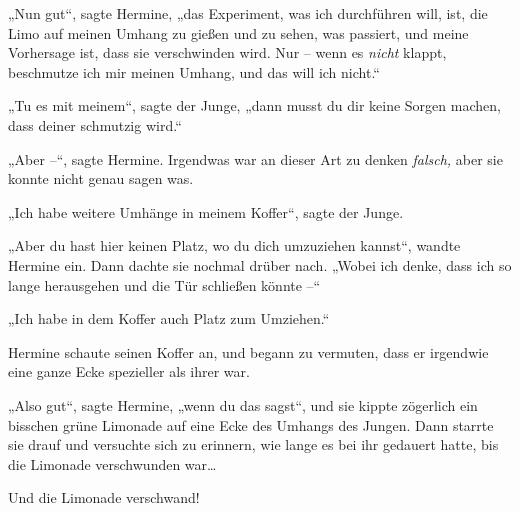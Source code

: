 „Nun gut“, sagte Hermine, „das Experiment, was ich durchführen will, ist, die Limo auf meinen Umhang zu gießen und zu sehen, was passiert, und meine Vorhersage ist, dass sie verschwinden wird. Nur – wenn es \emph{nicht} klappt, beschmutze ich mir meinen Umhang, und das will ich nicht.“

„Tu es mit meinem“, sagte der Junge, „dann musst du dir keine Sorgen machen, dass deiner schmutzig wird.“

„Aber –“, sagte Hermine. Irgendwas war an dieser Art zu denken \emph{falsch,} aber sie konnte nicht genau sagen was.

„Ich habe weitere Umhänge in meinem Koffer“, sagte der Junge.

„Aber du hast hier keinen Platz, wo du dich umzuziehen kannst“, wandte Hermine ein. Dann dachte sie nochmal drüber nach. „Wobei ich denke, dass ich so lange herausgehen und die Tür schließen könnte –“

„Ich habe in dem Koffer auch Platz zum Umziehen.“

Hermine schaute seinen Koffer an, und begann zu vermuten, dass er irgendwie eine ganze Ecke spezieller als ihrer war.

„Also gut“, sagte Hermine, „wenn du das sagst“, und sie kippte zögerlich ein bisschen grüne Limonade auf eine Ecke des Umhangs des Jungen. Dann starrte sie drauf und versuchte sich zu erinnern, wie lange es bei ihr gedauert hatte, bis die Limonade verschwunden war…

Und die Limonade verschwand!

